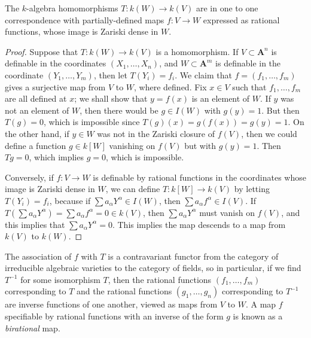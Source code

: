 \begin{theorem}
    The $k$-algebra homomorphisms $T: k(W) \to k(V)$ are in one to one correspondence with partially-defined maps $f: V \to W$ expressed as rational functions, whose image is Zariski dense in $W$.
\end{theorem}
\begin{proof}
    Suppose that $T: k(W) \to k(V)$ is a homomorphism. If $V \subset \mathbf{A}^n$ is definable in the coordinates $(X_1, \dots, X_n)$, and $W \subset \mathbf{A}^m$ is definable in the coordinate $(Y_1, \dots, Y_m)$, then let $T(Y_i) = f_i$. We claim that $f = (f_1, \dots, f_m)$ gives a surjective map from $V$ to $W$, where defined. Fix $x \in V$ such that $f_1,\dots,f_m$ are all defined at $x$; we shall show that $y = f(x)$ is an element of $W$. If $y$ was not an element of $W$, then there would be $g \in I(W)$ with $g(y) = 1$. But then $T(g) = 0$, which is impossible since $T(g)(x) = g(f(x)) = g(y) = 1$. On the other hand, if $y \in W$ was not in the Zariski closure of $f(V)$, then we could define a function $g \in k[W]$ vanishing on $f(V)$ but with $g(y) = 1$. Then $Tg = 0$, which implies $g = 0$, which is impossible.

    Conversely, if $f: V \to W$ is definable by rational functions in the coordinates whose image is Zariski dense in $W$, we can define $T: k[W] \to k(V)$ by letting $T(Y_i) = f_i$, because if $\sum a_\alpha Y^\alpha \in I(W)$, then $\sum a_\alpha f^\alpha \in I(V)$. If $T(\sum a_\alpha Y^\alpha) = \sum a_\alpha f^\alpha = 0 \in k(V)$, then $\sum a_\alpha Y^\alpha$ must vanish on $f(V)$, and this implies that $\sum a_\alpha Y^\alpha = 0$. This implies the map descends to a map from $k(V)$ to $k(W)$.
\end{proof}

The association of $f$ with $T$ is a contravariant functor from the category of irreducible algebraic varieties to the category of fields, so in particular, if we find $T^{-1}$ for some isomorphism $T$, then the rational functions $(f_1, \dots, f_m)$ corresponding to $T$ and the rational functions $(g_1, \dots, g_n)$ corresponding to $T^{-1}$ are inverse functions of one another, viewed as maps from $V$ to $W$. A map $f$ specifiable by rational functions with an inverse of the form $g$ is known as a \emph{birational} map.

